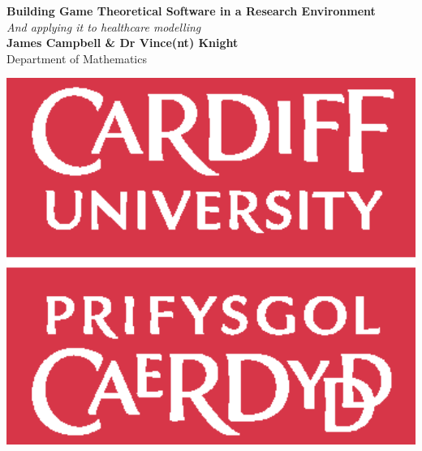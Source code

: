 \documentclass[a0,landscape]{a0poster}
\begin{document}
\begin{minipage}[b]{0.7\linewidth}
\veryHuge \color{NavyBlue} \textbf{Building Game Theoretical Software in a Research Environment} \color{Black}\\ %
\Huge\textit{And applying it to healthcare modelling}\\[1cm] %
\huge \textbf{James Campbell \& Dr Vince(nt) Knight}\\ %
\huge Department of Mathematics\\ %
\end{minipage}
%
%
\begin{minipage}[b]{0.3\linewidth}
\centering
\includegraphics[width=15cm]{images/logo.eps}
\end{minipage}
\end{document}
